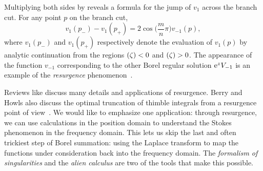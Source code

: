 \documentclass[10pt,a4paper]{amsart}
\let\Im\relax
\DeclareMathOperator{\Im}{Im}
\numberwithin{equation}{section}
\begin{document}
Multiplying both sides by  reveals a formula for the jump of $v_1$ across the branch cut. For any point $p$ on the branch cut,
\begin{equation}\label{eqn:resurg-rel-1}
v_1(p_-) - v_1(p_+) = 2\cos\bigl(\frac{m}{n}\pi\bigr) v_{-1}(p),
\end{equation}
where $v_1(p_-)$ and $v_1(p_+)$ respectively denote the evaluation of $v_1(p)$ by analytic continuation from the regions $\Im(\zeta) < 0$ and $\Im(\zeta) > 0$. The appearance of the function $v_{-1}$ corresponding to the other Borel regular solution ${\rm e}^z V_{-1}$ is an example of the {\em resurgence} phenomenon~\cite{EcalleI,EcalleII,EcalleIII}.

Reviews like \cite{aniceto2019primer,Dorigoni,diverg-resurg-i} discuss many details and applications of resurgence. Berry and Howls also discuss the optimal truncation of thimble integrals from a resurgence point of view~\cite{Berry_Howls}. We would like to emphasize one application: through resurgence, we can use calculations in the position domain to understand the Stokes phenomenon in the frequency domain. This lets us skip the last and often trickiest step of Borel summation: using the Laplace transform to map the functions under consideration back into the frequency domain. The {\em formalism of singularities} and the {\em alien calculus} are two of the tools that make this possible.
\end{document}
